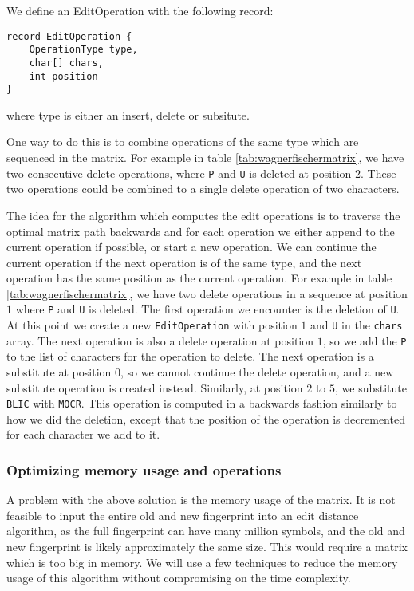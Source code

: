 We define an EditOperation with the following record:

\begin{lstlisting}
record EditOperation {
    OperationType type,
    char[] chars,
    int position
}
\end{lstlisting}

where type is either an insert, delete or subsitute.

One way to do this is to combine operations of the same type which are sequenced in the matrix.
For example in table \ref{tab:wagnerfischermatrix}, we have two consecutive delete
operations, where \verb|P| and \verb|U| is deleted at position $2$. These two operations
could be combined to a single delete operation of two characters.

The idea for the algorithm which computes the edit operations is to traverse the optimal
matrix path backwards and for each operation we either append to the current operation if
possible, or start a new operation. We can continue the current operation if the next
operation is of the same type, and the next operation has the same position as the current
operation. For example in table \ref{tab:wagnerfischermatrix}, we have two delete
operations in a sequence at position $1$ where \verb|P| and \verb|U| is deleted. The first
operation we encounter is the deletion of \verb|U|. At this point we create a new
\verb|EditOperation| with position $1$ and \verb|U| in the \verb|chars| array. The next
operation is also a delete operation at position $1$, so we add the \verb|P| to the list
of characters for the operation to delete. The next operation is a substitute at position
$0$, so we cannot continue the delete operation, and a new substitute operation is created
instead. Similarly, at position $2$ to $5$, we substitute \verb|BLIC| with \verb|MOCR|.
This operation is computed in a backwards fashion similarly to how we did the deletion,
except that the position of the operation is decremented for each character we add to it.

\subsubsection{Optimizing memory usage and operations}

A problem with the above solution is the memory usage of the matrix. It is not feasible to
input the entire old and new fingerprint into an edit distance algorithm, as the full
fingerprint can have many million symbols, and the old and new fingerprint is likely
approximately the same size. This would require a matrix which is too big in memory. We
will use a few techniques to reduce the memory usage of this algorithm without
compromising on the time complexity.

